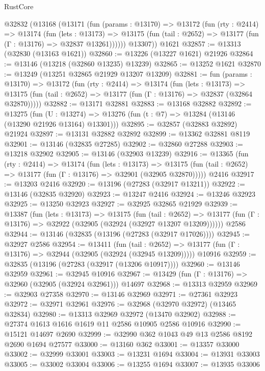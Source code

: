 \begin{lexlean}{RustCore}
\begin{coremodule}
    @32832
      (@13168
        (@13171
          (fun (params : @13170) =>
          @13172
            (fun (rty : @2414) =>
            @13174
              (fun (lets : @13173) =>
              @13175 (fun (tail : @2652) => @13177 (fun (Γ : @13176) => @32837 @13261))))))
        @13307))
    @1621
@32857 := @13313 (@32830 (@13163 @1621))
@32860 := @13226 (@13227 @1621) @21926
@32864 := @13146 (@13218 (@32860 @13235) @13239)
@32865 := @13252 @1621
@32870 := @13249 (@13251 @32865 @21929 @13207 @13209)
@32881 := fun (params : @13170) =>
  @13172
    (fun (rty : @2414) =>
    @13174
      (fun (lets : @13173) =>
      @13175 (fun (tail : @2652) => @13177 (fun (Γ : @13176) => @32837 (@32864 @32870)))))
@32882 := @13171 @32881
@32883 := @13168 @32882
@32892 := @13275
    (fun (U : @13274) => @13276 (fun (t : @7) => @13284 (@13146 (@13290 @21926 @13164) @13301)))
@32895 := @32857 (@32883 @32892) @21924
@32897 := @13131 @32882 @32892
@32899 := @13362 @32881 @8119
@32901 := @13146 (@32835 @27285)
@32902 := @32860 @27288
@32903 := @13218 @32902
@32905 := @13146 (@32903 @13239)
@32916 := @13365
    (fun (rty : @2414) =>
    @13174
      (fun (lets : @13173) =>
      @13175 (fun (tail : @2652) => @13177 (fun (Γ : @13176) => @32901 (@32905 @32870)))))
    @2416
@32917 := @13203 @2416
@32920 := @13196 (@27283 (@32917 @13211))
@32922 := @13146 (@32835 @32920)
@32923 := @13247 @2416
@32924 := @13246 @32923
@32925 := @13250 @32923
@32927 := @32925 @32865 @21929
@32939 := @13387
    (fun (lets : @13173) =>
    @13175
      (fun (tail : @2652) =>
      @13177 (fun (Γ : @13176) => @32922 (@32905 (@32924 (@32927 @13207 @13209))))))
    @2586
@32944 := @13146 (@32835 (@13196 (@27283 (@32917 @17026))))
@32945 := @32927 @2586
@32954 := @13411
    (fun (tail : @2652) => @13177 (fun (Γ : @13176) => @32944 (@32905 (@32924 (@32945 @13209)))))
    @10916
@32959 := @32835 (@13196 (@27283 (@32917 (@13206 @10917))))
@32960 := @13146 @32959
@32961 := @32945 @10916
@32967 := @13429 (fun (Γ : @13176) => @32960 (@32905 (@32924 @32961))) @14697
@32968 := @13313 @32959
@32969 := @32903 @27358
@32970 := @13146 @32969
@32971 := @27361 @32923
@32972 := @32971 @32961
@32976 := @32968 (@32970 @32972) (@13465 @32834)
@32980 := @13313 @32969 @32972 (@13470 @32902)
@32988 := @27374 @1613 @1616 @1619 @11 @2586 @10905 @2586 @10916
@32990 := @15121 @14697 @2690
@32999 := @32990 @362 @1043 @49 @13 @2586 @8192 @2690 @1694 @27577
@33000 := @13160 @362
@33001 := @13357 @33000
@33002 := @32999 @33001
@33003 := @13231 @1694
@33004 := @13931 @33003
@33005 := @33002 @33004
@33006 := @13255 @1694
@33007 := @13935 @33006

\end{coremodule}
\end{lexlean}
